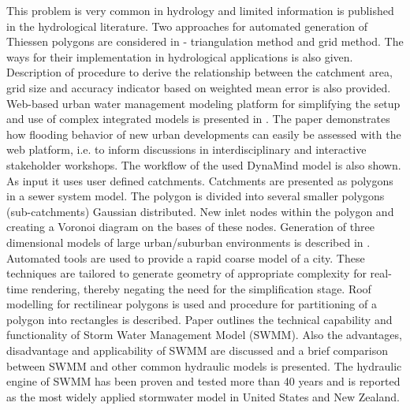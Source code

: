 \documentclass[11pt,leqno]{book}
\begin{document}
This problem is very common in hydrology and limited information is published in the hydrological literature. Two approaches for automated generation of Thiessen polygons are considered in \cite{han:bra:1} - triangulation method and grid method. The ways for their implementation in hydrological applications is also given. Description of procedure to derive the relationship between the catchment area, grid size and accuracy indicator based on weighted mean error is also provided. Web-based urban water management modeling platform for simplifying the setup and use of complex integrated models is presented in \cite{mai:mik:1}. The paper demonstrates how flooding behavior of new urban developments can easily be assessed with the web platform, i.e. to inform discussions in interdisciplinary and interactive stakeholder workshops. The workflow of the used DynaMind model is also shown. As input it uses user defined catchments. Catchments are presented as polygons in a sewer system model. The polygon is divided into several smaller polygons (sub-catchments) Gaussian distributed. New inlet nodes within the polygon and creating a Voronoi diagram on the bases of these nodes. Generation of three dimensional models of large urban/suburban environments is described in \cite{lay:day:1}. Automated tools are used to provide a rapid coarse model of a city. These techniques are tailored to generate geometry of appropriate complexity for real-time rendering, thereby negating the need for the simplification stage. Roof modelling for rectilinear polygons is used and procedure for partitioning of a polygon into rectangles is described. Paper \cite{lockie:1} outlines the technical capability and functionality of Storm Water Management Model (SWMM). Also the advantages, disadvantage and applicability of SWMM are discussed and a brief comparison between SWMM and other common hydraulic models is presented. The hydraulic engine of SWMM has been proven and tested more than 40 years and is reported as the most widely applied stormwater model in United States and New Zealand.
\end{document}
